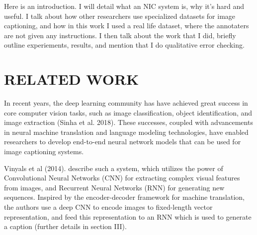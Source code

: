 \documentclass[letterpaper, 10 pt, conference]{ieeeconf}
\begin{document}
Here is an introduction. I will detail what an NIC system is, why it's hard and useful. I talk about how other researchers use specialized datasets for image captioning, and how in this work I used a real life dataset, where the annotaters are not given any instructions. I then talk about the work that I did, briefly outline experiements, results, and mention that I do qualitative error checking. 

\section{RELATED WORK}

In recent years, the deep learning community has have achieved great success in core computer vision tasks, such as image classification, object identification, and image extraction (Sinha et al. 2018). These successes, coupled with advancements in neural machine translation and language modeling technologies, have enabled researchers to develop end-to-end neural network models that can be used for image captioning systems. 

Vinyals et al (2014). describe such a system, which utilizes the power of Convolutional Neural Networks (CNN) for extracting complex visual features from images, and Recurrent Neural Networks (RNN) for generating new sequences. Inspired by the encoder-decoder framework for machine translation, the authors use a deep CNN to encode images to fixed-length vector representation, and feed this representation to an RNN which is used to generate a caption (further details in section III). 
\end{document}
